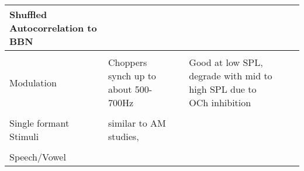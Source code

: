 \documentclass[10pt,a4paper]{article}
\begin{document}
\begin{flushleft}
\begin{supertabular}{|m{3.9609997cm}|m{2.9099998cm}|m{2.8739998cm}|m{2.846cm}|m{2.836cm}|m{2.839cm}|}
\\\hline
                    Shuffled Autocorrelation to BBN                     &                       \citep{LouageJorisEtAl:2004}                       & & 
                                                                        &                                                                          & 

\\\hline
                                                                        &                                                                          & & & & \\\hline
                              Modulation                                & Choppers synch up to about 500-
700Hz
\citep{BlackburnSachs:1989,Bourk:1976,FrisinaKarcichEtAl:1996,FrisinaSmithEtAl:1990,FrisinaSmithEtAl:1990a;FrisinaWaltonEtAl:1993,RhodeGreenberg:1994a,WangSachs:1994;WinterPalmer:1990}
                                                                        &                                                                          & Good at low SPL, degrade with mid to high SPL due to OCh inhibition
\citep{JorisSmith:1998}
                                                                        &                                                                          & \citep{Evans:1978,Javel:1980,PalmerEvans:1982}\\\hline
                                                                        &                                                                          & & & & 
\\\hline
                        Single formant Stimuli                          & \citep{Rhode:1998} similar to AM
                    studies,\citep{WangSachs:1994}                      &                                                                          & & & \citep{WangSachs:1993}\\\hline
                                                                        &                                                                          & & 
                                                                        &                                                                          & \\\hline
                             Speech/Vowel                               &                                                                          & & & & 
\citep{Geisler:1988,KiangMoxon:1974,SachsWinslowEtAl:1988,SachsYoung:1979,YoungSachs:1979}\\\hline

\end{supertabular}
\end{flushleft}
\end{document}
